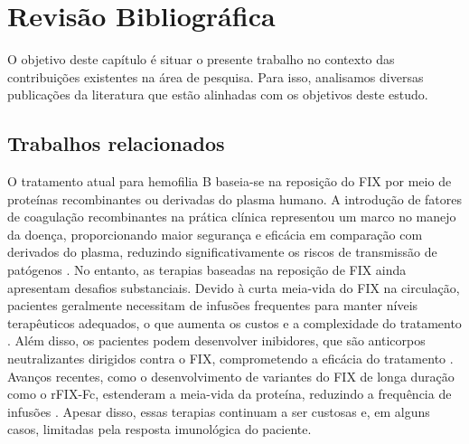
\chapter{Revisão Bibliográfica}
\label{subsection:structure_pred}

O objetivo deste capítulo é situar o presente trabalho no contexto das contribuições existentes na área de pesquisa.
Para isso, analisamos diversas publicações da literatura que estão alinhadas com os objetivos deste estudo.


\section{Trabalhos relacionados}
O tratamento atual para hemofilia B baseia-se na reposição do FIX por meio de proteínas recombinantes ou derivadas do plasma humano. 
A introdução de fatores de coagulação recombinantes na prática clínica representou um marco no manejo da doença, 
proporcionando maior segurança e eficácia em comparação com derivados do plasma, 
reduzindo significativamente os riscos de transmissão de patógenos \cite{COHEN1995675}.  
No entanto, as terapias baseadas na reposição de FIX ainda apresentam desafios substanciais.
Devido à curta meia-vida do FIX na circulação, 
pacientes geralmente necessitam de infusões frequentes para manter níveis terapêuticos adequados,
o que aumenta os custos e a complexidade do tratamento \cite{Mancuso}. 
Além disso, os pacientes podem desenvolver inibidores, 
que são anticorpos neutralizantes dirigidos contra o FIX,
comprometendo a eficácia do tratamento \cite{Mancuso2}.
Avanços recentes, como o desenvolvimento de variantes do FIX de longa duração como o rFIX-Fc, 
estenderam a meia-vida da proteína, reduzindo a frequência de infusões \cite{Massimo}. 
Apesar disso, essas terapias continuam a ser custosas e, em alguns casos,
limitadas pela resposta imunológica do paciente.  



